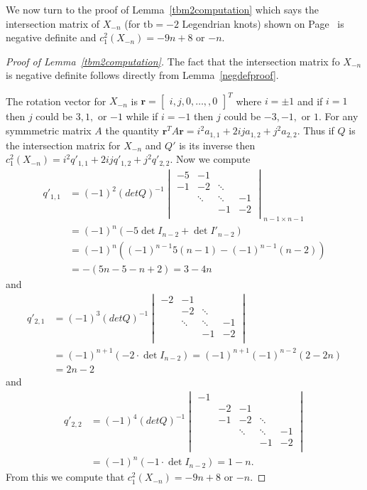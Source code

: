 \documentclass[12pt]{amsart}
\theoremstyle{definition}
\theoremstyle{definition}
\newcommand{\tb}{\text{tb}}
\begin{document}
		We now turn to the proof of Lemma~\ref{tbm2computation} which says the intersection matrix of $X_{-n}$ (for $\tb=-2$ Legendrian knots) shown on Page~\pageref{tbm2computation} is negative definite and $c_1^2(X_{-n})=-9n+8$ or $-n$.
		\begin{proof}[Proof of Lemma~\ref{tbm2computation}]
			The fact that the intersection matrix fo $X_{-n}$ is negative definite follows directly from Lemma~\ref{negdefproof}. 
			
			The rotation vector for $X_{-n}$ is $\mathbf{r}=\begin{bmatrix}i,j, 0,\ldots, ,0\end{bmatrix}^T$ where $i=\pm 1$ and if $i=1$ then $j$ could be $3, 1,$ or $-1$ while if $i=-1$ then $j$ could be $-3, -1,$ or $1$. For any symmmetric matrix $A$ the quantity $\mathbf{r}^TA\mathbf{r}=i^2a_{1,1}+ 2ija_{1,2} + j^2a_{2,2}$. Thus if $Q$ is the intersection matrix for $X_{-n}$ and $Q'$ is its inverse then $c_1^2(X_{-n})= i^2q'_{1,1}+ 2ijq'_{1,2} + j^2q'_{2,2}$. Now we compute
			\begin{align*}
				q'_{1,1} &= (-1)^{2}(det Q)^{-1} \begin{vmatrix}
					-5 & -1 & &   \\
					-1 & -2 & \ddots&    \\
					& \ddots & \ddots  &-1\\
					&&-1 & -2   \\
				\end{vmatrix}_{n-1 \times n-1}\\%
				&=(-1)^n \left( -5 \det I_{n-2}
				+\det I'_{n-2}\right)\\%
				&=(-1)^n((-1)^{n-1}5(n-1)-(-1)^{n-1}(n-2))\\
				&=-(5n-5-n+2)=3-4n
			\end{align*}
			and
			\begin{align*}
				q'_{2,1}&= (-1)^3(det Q)^{-1}  \begin{vmatrix}
					-2  & -1 & &   \\
					& -2 & \ddots&    \\
					& \ddots & \ddots  &-1\\
					&&-1 & -2   \\
				\end{vmatrix}\\%
				&=(-1)^{n+1}(-2\cdot \det I_{n-2})=(-1)^{n+1}(-1)^{n-2}(2-2n)\\
				&=2n-2
			\end{align*}
			and
			\begin{align*}
				q'_{2,2}&= (-1)^4(det Q)^{-1}  \begin{vmatrix}
					-1 &  & & &  \\
					& -2 & -1 & &   \\
					& -1 & -2 & \ddots&    \\
					&  & \ddots & \ddots  &-1\\
					&&&-1 & -2   \\
				\end{vmatrix}\\%
				&= (-1)^n(-1\cdot \det I_{n-2})=1-n.
			\end{align*}
			From this we compute that $c_1^2(X_{-n})=-9n+8$ or $-n$. 
		\end{proof}
		
\end{document}
